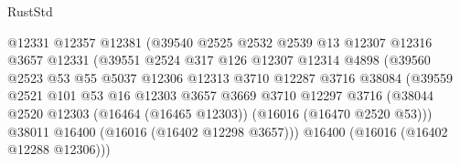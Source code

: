 \begin{lexlean}{RustStd}
\begin{coremodule}
                                      @12331
                                      @12357
                                      @12381
                                      (@39540
                                        @2525
                                        @2532
                                        @2539
                                        @13
                                        @12307
                                        @12316
                                        @3657
                                        @12331
                                        (@39551
                                          @2524
                                          @317
                                          @126
                                          @12307
                                          @12314
                                          @4898
                                          (@39560
                                            @2523
                                            @53
                                            @55
                                            @5037
                                            @12306
                                            @12313
                                            @3710
                                            @12287
                                            @3716
                                            @38084
                                            (@39559
                                              @2521
                                              @101
                                              @53
                                              @16
                                              @12303
                                              @3657
                                              @3669
                                              @3710
                                              @12297
                                              @3716
                                              (@38044
                                                @2520
                                                @12303
                                                (@16464 (@16465 @12303))
                                                (@16016 (@16470 @2520 @53)))
                                              @38011
                                              @16400
                                              (@16016 (@16402 @12298 @3657)))
                                            @16400
                                            (@16016 (@16402 @12288 @12306)))

\end{coremodule}
\end{lexlean}
